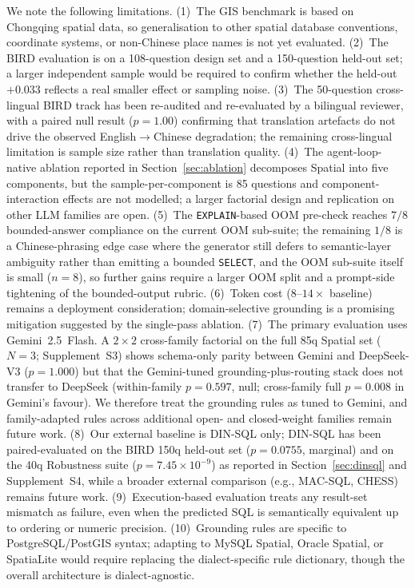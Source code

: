 \documentclass[11pt]{article}
\begin{document}
We note the following limitations. (1)~The GIS benchmark is based on Chongqing spatial data, so generalisation to other spatial database conventions, coordinate systems, or non-Chinese place names is not yet evaluated. (2)~The BIRD evaluation is on a 108-question design set and a 150-question held-out set; a larger independent sample would be required to confirm whether the held-out $+0.033$ reflects a real smaller effect or sampling noise. (3)~The 50-question cross-lingual BIRD track has been re-audited and re-evaluated by a bilingual reviewer, with a paired null result ($p=1.00$) confirming that translation artefacts do not drive the observed English$\to$Chinese degradation; the remaining cross-lingual limitation is sample size rather than translation quality. (4)~The agent-loop-native ablation reported in Section~\ref{sec:ablation} decomposes Spatial into five components, but the sample-per-component is 85 questions and component-interaction effects are not modelled; a larger factorial design and replication on other LLM families are open. (5)~The \texttt{EXPLAIN}-based OOM pre-check reaches $7/8$ bounded-answer compliance on the current OOM sub-suite; the remaining $1/8$ is a Chinese-phrasing edge case where the generator still defers to semantic-layer ambiguity rather than emitting a bounded \texttt{SELECT}, and the OOM sub-suite itself is small ($n=8$), so further gains require a larger OOM split and a prompt-side tightening of the bounded-output rubric. (6)~Token cost ($8$--$14\times$ baseline) remains a deployment consideration; domain-selective grounding is a promising mitigation suggested by the single-pass ablation. (7)~The primary evaluation uses Gemini~2.5~Flash. A $2{\times}2$ cross-family factorial on the full 85q Spatial set ($N{=}3$; Supplement~S3) shows schema-only parity between Gemini and DeepSeek-V3 ($p=1.000$) but that the Gemini-tuned grounding-plus-routing stack does not transfer to DeepSeek (within-family $p=0.597$, null; cross-family full $p=0.008$ in Gemini's favour). We therefore treat the grounding rules as tuned to Gemini, and family-adapted rules across additional open- and closed-weight families remain future work. (8)~Our external baseline is DIN-SQL only; DIN-SQL has been paired-evaluated on the BIRD 150q held-out set ($p=0.0755$, marginal) and on the 40q Robustness suite ($p=7.45\times10^{-9}$) as reported in Section~\ref{sec:dinsql} and Supplement~S4, while a broader external comparison (e.g., MAC-SQL, CHESS) remains future work. (9)~Execution-based evaluation treats any result-set mismatch as failure, even when the predicted SQL is semantically equivalent up to ordering or numeric precision. (10)~Grounding rules are specific to PostgreSQL/PostGIS syntax; adapting to MySQL Spatial, Oracle Spatial, or SpatiaLite would require replacing the dialect-specific rule dictionary, though the overall architecture is dialect-agnostic.
\end{document}
